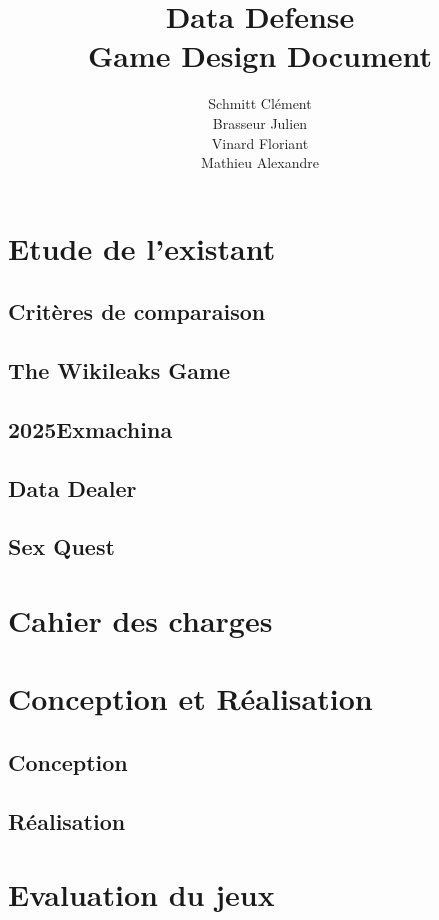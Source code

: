 \documentclass[a4paper]{report}
\title{Data Defense \\ Game Design Document}
\author{Schmitt Clément \\ Brasseur Julien \\ Vinard Floriant \\ Mathieu Alexandre}
\begin{document}
\maketitle

\tableofcontents

\chapter{Etude de l'existant}
\section{Critères de comparaison}
\section{The Wikileaks Game}
\section{2025Exmachina}
\section{Data Dealer}
\section{Sex Quest}

\chapter{Cahier des charges}

\chapter{Conception et Réalisation}
\section{Conception}
\section{Réalisation}

\chapter{Evaluation du jeux}
\end{document}
